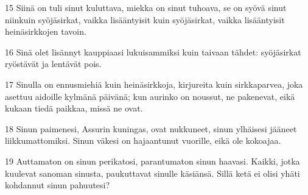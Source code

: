 \par 15 Siinä on tuli sinut kuluttava, miekka on sinut tuhoava, se on syövä sinut niinkuin syöjäsirkat, vaikka lisääntyisit kuin syöjäsirkat, vaikka lisääntyisit heinäsirkkojen tavoin.
\par 16 Sinä olet lisännyt kauppiaasi lukuisammiksi kuin taivaan tähdet: syöjäsirkat ryöstävät ja lentävät pois.
\par 17 Sinulla on ennusmiehiä kuin heinäsirkkoja, kirjureita kuin sirkkaparvea, joka asettuu aidoille kylmänä päivänä; kun aurinko on noussut, ne pakenevat, eikä kukaan tiedä paikkaa, missä ne ovat.
\par 18 Sinun paimenesi, Assurin kuningas, ovat nukkuneet, sinun ylhäisesi jääneet liikkumattomiksi. Sinun väkesi on hajaantunut vuorille, eikä ole kokoajaa.
\par 19 Auttamaton on sinun perikatosi, parantumaton sinun haavasi. Kaikki, jotka kuulevat sanoman sinusta, paukuttavat sinulle käsiänsä. Sillä ketä ei olisi yhäti kohdannut sinun pahuutesi?


